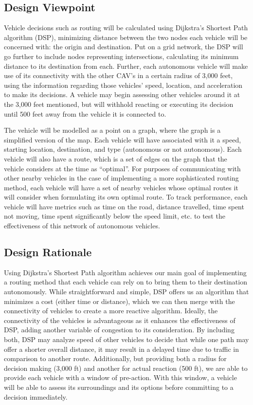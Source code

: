 \documentclass[onecolumn, draftclsnofoot,10pt, compsoc]{IEEEtran}
\begin{document}
\subsection{Design Viewpoint}
Vehicle decisions such as routing will be calculated using Dijkstra’s Shortest Path algorithm (DSP), minimizing distance between the two nodes each vehicle will be concerned with: the origin and destination.
Put on a grid network, the DSP will go further to include nodes representing intersections, calculating its minimum distance to its destination from each.
Further, each autonomous vehicle will make use of its connectivity with the other CAV’s in a certain radius of 3,000 feet, using the information regarding those vehicles’ speed, location, and acceleration to make its decisions.
A vehicle may begin assessing other vehicles around it at the 3,000 feet mentioned, but will withhold reacting or executing its decision until 500 feet away from the vehicle it is connected to. 

The vehicle will be modelled as a point on a graph, where the graph is a simplified version of the map.
Each vehicle will have associated with it a speed, starting location, destination, and type (autonomous or not autonomous).
Each vehicle will also have a route, which is a set of edges on the graph that the vehicle considers at the time as “optimal”.
For purposes of communicating with other nearby vehicles in the case of implementing a more sophisticated routing method, each vehicle will have a set of nearby vehicles whose optimal routes it will consider when formulating its own optimal route.
To track performance, each vehicle will have metrics such as time on the road, distance travelled, time spent not moving, time spent significantly below the speed limit, etc. to test the effectiveness of this network of autonomous vehicles.
\subsection{Design Rationale}
Using Dijkstra’s Shortest Path algorithm achieves our main goal of implementing a routing method that each vehicle can rely on to bring them to their destination autonomously.
While straightforward and simple, DSP offers us an algorithm that minimizes a cost (either time or distance), which we can then merge with the connectivity of vehicles to create a more reactive algorithm.
Ideally, the connectivity of the vehicles is advantageous as it enhances the effectiveness of DSP, adding another variable of congestion to its consideration.
By including both, DSP may analyze speed of other vehicles to decide that while one path may offer a shorter overall distance, it may result in a delayed time due to traffic in comparison to another route.
Additionally, but providing both a radius for decision making (3,000 ft) and another for actual reaction (500 ft), we are able to provide each vehicle with a window of pre-action.
With this window, a vehicle will be able to assess its surroundings and its options before committing to a decision immediately.
\end{document}
